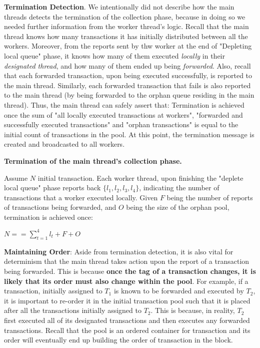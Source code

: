 \textbf{Termination Detection}. We intentionally did not describe how the main threads detects the
termination of the collection phase, because in doing so we needed further information from the
worker thread's logic. Recall that the main thread knows how many transactions it has initially
distributed between all the workers. Moreover, from the reports sent by thw worker at the end of
"Depleting local queue" phase, it knows how many of them executed \textit{locally} in their
\textit{designated thread}, and how many of them ended up being \textit{forwarded}. Also, recall
that each forwarded transaction, upon being executed successfully, is reported to the main thread.
Similarly, each forwarded transaction that fails is also reported to the main thread (by being
forwarded to the orphan queue residing in the main thread). Thus, the main thread can safely assert
that: Termination is achieved once the sum of "all locally executed transactions at workers",
"forwarded and successfully executed transactions" and "orphan transactions" is equal to the initial
count of transactions in the pool. At this point, the termination message is created and broadcasted
to all workers.

\begin{lemma}
	\textbf{Termination of the main thread's collection phase. }

	Assume $N$ initial transaction. Each worker thread, upon finishing the "deplete local queue"
	phase reports back $\{ l_{1}, l_{2}, l_{3}, l_{4} \}$, indicating the number of transactions
	that a worker executed locally. Given $F$ being the number of reports of transactions being
	forwarded, and $O$ being the size of the orphan pool, termination is achieved once:

	\vspace{0.3cm}
	$N == \sum_{t = 1}^{4} l_{t} + F + O$
\end{lemma}

\textbf{Maintaining Order}: Aside from termination detection, it is also vital for determinism that
the main thread takes action upon the report of a transaction being forwarded. This is because
\textbf{once the tag of a transaction changes, it is likely that its order must also change within
the pool}. For example, if a transaction, initially assigned to $T_{1}$ is known to be forwarded and
executed by $T_{2}$, it is important to re-order it in the initial transaction pool such that it is
placed after all the transactions initially assigned to $T_{2}$. This is because, in reality,
$T_{2}$ first executed all of its designated transactions and then executes any forwarded
transactions. Recall that the pool is an ordered container for transaction and its order will
eventually end up building the order of transaction in the block.

